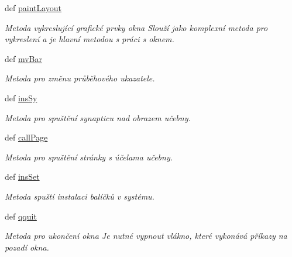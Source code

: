 \begin{DoxyCompactItemize}
def \hyperlink{classmnFocus_1_1App_a600fc232b0400302e1f235e1e1b463f7}{paint\-Layout}
\begin{DoxyCompactList}\small\item\em Metoda vykreslující grafické prvky okna Slouží jako komplexní metoda pro vykreslení a je hlavní metodou s práci s oknem. \end{DoxyCompactList}\item 
def \hyperlink{classmnFocus_1_1App_abeafb220b3de369f9c53303aee0021b5}{mv\-Bar}
\begin{DoxyCompactList}\small\item\em Metoda pro změnu průběhového ukazatele. \end{DoxyCompactList}\item 
def \hyperlink{classmnFocus_1_1App_af603a2648869e9af45d927b6b2aa360d}{ins\-Sy}
\begin{DoxyCompactList}\small\item\em Metoda pro spuštění synapticu nad obrazem učebny. \end{DoxyCompactList}\item 
def \hyperlink{classmnFocus_1_1App_aee9420a407130cec034afb6d5c32278c}{call\-Page}
\begin{DoxyCompactList}\small\item\em Metoda pro spuštění stránky s účelama učebny. \end{DoxyCompactList}\item 
def \hyperlink{classmnFocus_1_1App_a2ad6e7b25e3ebd9dbf284a5046ed22d0}{ins\-Set}
\begin{DoxyCompactList}\small\item\em Metoda spuští instalaci balíčků v systému. \end{DoxyCompactList}\item 
def \hyperlink{classmnFocus_1_1App_af8116e51713d83edb9b3d91cf4449329}{qquit}
\begin{DoxyCompactList}\small\item\em Metoda pro ukončení okna Je nutné vypnout vlákno, které vykonává příkazy na pozadí okna. \end{DoxyCompactList}\end{DoxyCompactItemize}
